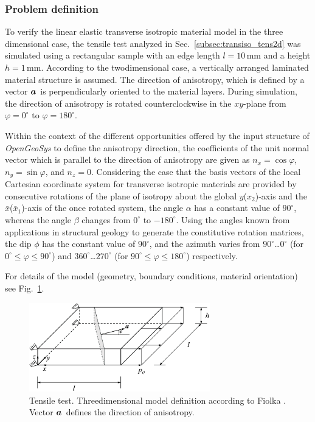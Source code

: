 \subsubsection*{Problem definition}

To verify the linear elastic transverse isotropic material model in the three dimensional case, the tensile test analyzed in Sec.~\ref{subsec:transiso_tens2d} was simulated using a rectangular sample with an edge length $l=10\,$mm and a height $h=1\,$mm. According to the twodimensional case, a vertically arranged laminated material structure is assumed. The direction of anisotropy, which is defined by a vector $\mbox{${\mbox{\boldmath${a}$\unboldmath}}_{\:\!}$}$ is perpendicularly oriented to the material layers. During simulation, the direction of anisotropy is rotated counterclockwise in the $xy$-plane from $\varphi=0^{\circ}$ to $\varphi=180^{\circ}$. 

Within the context of the different opportunities offered by the input structure of {\sl OpenGeoSys} to define the anisotropy direction, the coefficients of the unit normal vector which is parallel to the direction of anisotropy are given as $n_x=\cos\varphi$, $n_y=\sin\varphi$, and $n_z=0$. Considering the case that the basis vectors of the local Cartesian coordinate system for transverse isotropic materials are provided by consecutive rotations of the plane of isotropy about the global $y$($x_2$)-axis and the $\bar{x}$($\bar{x}_1$)-axis of the once rotated system, the angle $\alpha$ has a constant value of $90^{\circ}$, whereas the angle $\beta$ changes from $0^{\circ}$ to $-180^{\circ}$. Using the angles known from applications in structural geology to generate the constitutive rotation matrices, the dip $\phi$ has the constant value of $90^{\circ}$, and the azimuth varies from $90^{\circ}$\dots$0^{\circ}$ (for $0^{\circ}\leq\varphi\leq 90^{\circ}$) and $360^{\circ}$\dots$270^{\circ}$ (for $90^{\circ}\leq\varphi\leq 180^{\circ}$) respectively.

For details of the model (geometry, boundary conditions, material orientation) see Fig.~\ref{tens_transiso_model_3d}.

\begin{figure}[!htb]
\begin{center}
\includegraphics[width=0.7\textwidth]{M/figure/tenstest_model_3D.eps}
\end{center}
\caption{Tensile test. Threedimensional model definition according to Fiolka \cite{Fiolka:2007}. Vector $\mbox{${\mbox{\boldmath${a}$\unboldmath}}_{\:\!}$}$ defines the direction of anisotropy.} 
\label{tens_transiso_model_3d}
\end{figure}

